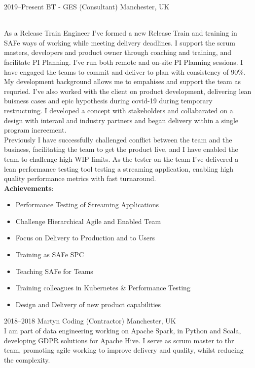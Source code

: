 \documentclass[]{cv-style}          %
\begin{document}
\begin{entrylist}
\entry
  {2019--Present}
  {BT - GES (Consultant)}
  {Manchester, UK}
  {\\
  As a Release Train Engineer I've formed a new Release Train and training in SAFe ways of working while meeting delivery deadlines.
  I support the scrum masters, developers and product owner through coaching and training, and facilitate PI Planning. I've run both remote and on-site PI Planning sessions. I have engaged the teams to commit and deliver to plan with consistency of 90\%. My development background allows me to empahises and support the team as requried.
  I've also worked with the client on product development, delivering lean buisness cases and epic hypothesis during covid-19 during temporary restructuing. I developed a concept with stakeholders and collabarated on a design with interanl and industry partners and began delivery within a single program increement.\\
  Previously I have successfully challenged conflict between the team and the business, facilitating the team to get the product live, and I have enabled the team to challenge high WIP limits.
  As the tester on the team I've delivered a lean performance testing tool testing a streaming application, enabling high quality performance metrics with fast turnaround.
  \\
  \textbf{Achievements}:
  \begin{itemize}
    \item Performance Testing of Streaming Applications
    \item Challenge Hierarchical Agile and Enabled Team
    \item Focus on Delivery to Production and to Users
    \item Training as SAFe SPC
    \item Teaching SAFe for Teams
    \item Training colleagues in Kubernetes & Performance Testing
    \item Design and Delivery of new product capabilities
  \end{itemize}
  }
\entry
  {2018--2018}
  {Martyn Coding (Contractor)}
  {Manchester, UK}
  {\\
  I am part of data engineering working on Apache Spark, in Python and Scala, developing GDPR solutions for Apache Hive.
  I serve as scrum master to thr team, promoting agile working to improve delivery and quality, whilst reducing the complexity.
}
\end{entrylist}
\end{document}
